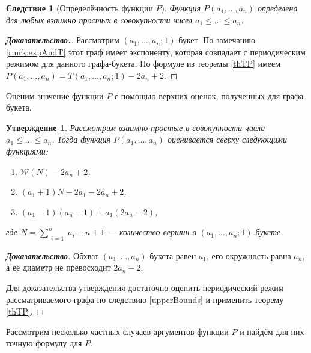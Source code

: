 \documentclass[12pt]{article}
\newtheorem{proposition}[theorem]{Утверждение}
\newtheorem{corollary}[theorem]{Следствие}
\theoremstyle{definition}
\begin{document}
\begin{corollary}[Определённость функции $P$]
Функция $P(a_1, \dots, a_n)$ определена для любых взаимно простых в совокупности чисел $a_1 \le \dots \le a_n$.
\end{corollary}
\begin{proof}[\textbf{Доказательство.}]
Рассмотрим $(a_1, \dots, a_n; 1)$-букет. По замечанию \ref{rmrk:expAndT} этот граф имеет экспоненту, которая совпадает с периодическим режимом для данного графа-букета. По формуле из теоремы \ref{thTP} имеем $P(a_1, \dots, a_n) = T(a_1, \dots, a_n; 1) - 2a_n + 2$.
\end{proof}

Оценим значение функции $P$ с помощью верхних оценок, полученных для графа-букета.

\begin{proposition}
\label{upperBoundsP}
Рассмотрим взаимно простые в совокупности числа $a_1 \le \dots \le a_n$. Тогда функция $P(a_1, \dots, a_n)$ оценивается сверху следующими функциями:
\begin{enumerate}
\item $\mathcal{W}(N) - 2a_n + 2$,
\item $(a_1 + 1)N - 2a_1 - 2a_n + 2$,
\item $(a_1 - 1)(a_n - 1) + a_1(2a_n - 2)$,
\end{enumerate}
где $N = \sum\limits_{\substack{i=1}}^n a_i - n + 1$ --- количество вершин в $(a_1, \dots, a_n; 1)$-букете.
\end{proposition}
\begin{proof}[\textbf{Доказательство}]
Обхват $(a_1, \dots, a_n)$-букета равен $a_1$, его окружность равна $a_n$, а её диаметр не превосходит $2a_n - 2$.

Для доказательства утверждения достаточно оценить периодический режим рассматриваемого графа по следствию \ref{upperBounds} и применить теорему \ref{thTP}.
\end{proof}

Рассмотрим несколько частных случаев аргументов функции $P$ и найдём для них точную формулу для $P$.
\end{document}
